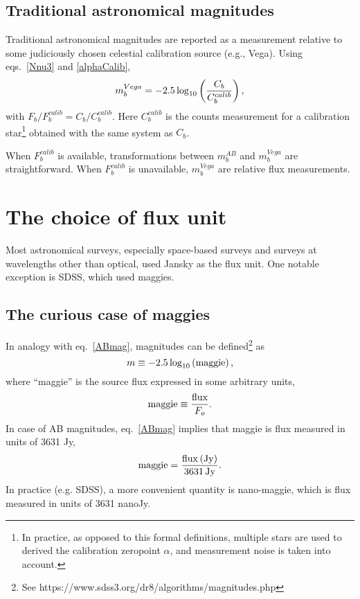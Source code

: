 \documentclass{emulateapj}
\begin{document}
\subsection{Traditional astronomical magnitudes \label{sec:tradmag}} 

Traditional astronomical magnitudes are reported as a measurement relative to some
judiciously chosen celestial calibration source (e.g., Vega). Using eqs.~\ref{Nnu3}
and \ref{alphaCalib},
\begin{equation}
\label{Vegamag}
               m^{Vega}_b = -2.5\log_{10}\left({C_b \over C^{calib}_{b}}\right),
\end{equation}
with $F_b/F^{calib}_{b} = C_b / C_b^{calib}$. Here $C_b^{calib}$ is the counts 
measurement for a calibration star\footnote{In practice, as opposed to this
formal definitions, multiple stars are used to derived the calibration zeropoint $\alpha$,
and measurement noise is taken into account.} obtained with the same system as
$C_b$.

When $F^{calib}_{b}$ is available, transformations between $m^{AB}_b$ and $m^{Vega}_b$
are straightforward. When $F^{calib}_{b}$ is unavailable, $m^{Vega}_b$ are relative 
flux measurements.  



\section{The choice of flux unit}  

Most astronomical surveys, especially space-based surveys and surveys
at wavelengths other than optical, used Jansky as the flux unit.  One notable
exception is SDSS, which used maggies. 


\subsection{The curious case of maggies} 

In analogy with eq.~\ref{ABmag}, magnitudes can be defined\footnote{
See https://www.sdss3.org/dr8/algorithms/magnitudes.php} as 
\begin{equation}
\label{maggie}
               m \equiv - 2.5\log_{10}\left({\rm maggie}\right),
\end{equation}
where ``maggie'' is the source flux expressed in some arbitrary
units,
\begin{equation}
\label{maggie2}
               {\rm maggie} \equiv {{\rm flux } \over F_o}. 
\end{equation}
In case of AB magnitudes, eq.~\ref{ABmag} implies that maggie is 
flux measured in units of 3631 Jy, 
\begin{equation}
\label{eq:defmaggie} 
           {\rm maggie} = {{\rm flux \, (Jy)} \over {\rm 3631 \, Jy}}. 
\end{equation} 
In practice (e.g. SDSS), a more convenient
quantity is nano-maggie, which is flux measured in units of 3631 nanoJy.
\end{document}
